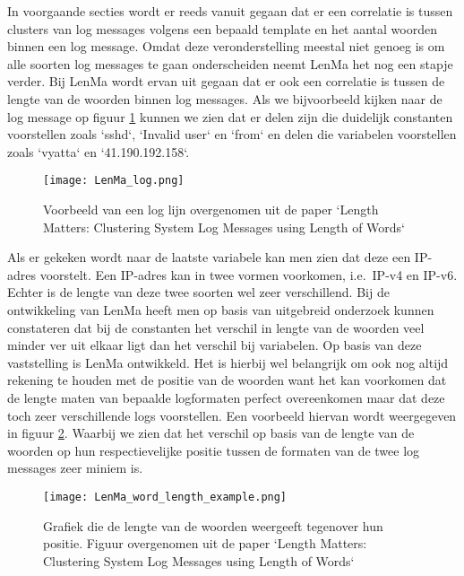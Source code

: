 In voorgaande secties wordt er reeds vanuit gegaan dat er een correlatie is tussen clusters van log messages volgens een bepaald template en het aantal woorden binnen een log message. Omdat deze veronderstelling meestal niet genoeg is om alle soorten log messages te gaan onderscheiden neemt LenMa het nog een stapje verder. Bij LenMa wordt ervan uit gegaan dat er ook een correlatie is tussen de lengte van de woorden binnen log messages. Als we bijvoorbeeld kijken naar de log message op figuur \ref{pic:LenMavoorbeeld} kunnen we zien dat er delen zijn die duidelijk constanten voorstellen zoals `sshd`, `Invalid user` en `from` en delen die variabelen voorstellen zoals `vyatta` en `41.190.192.158`.\\

\begin{figure}[!htp]
    \texttt{[image: LenMa\_log.png]}
    \caption{Voorbeeld van een log lijn overgenomen uit de paper `Length Matters: Clustering System Log Messages using Length of Words` \autocite{shima2016length}}
    \label{pic:LenMavoorbeeld}
\end{figure}

Als er gekeken wordt naar de laatste variabele kan men zien dat deze een IP-adres voorstelt. Een IP-adres kan in twee vormen voorkomen, i.e.\ IP-v4 en IP-v6. Echter is de lengte van deze twee soorten wel zeer verschillend. Bij de ontwikkeling van LenMa heeft men op basis van uitgebreid onderzoek kunnen constateren dat bij de constanten het verschil in lengte van de woorden veel minder ver uit elkaar ligt dan het verschil bij variabelen. Op basis van deze vaststelling is LenMa  ontwikkeld. Het is hierbij wel belangrijk om ook nog altijd rekening te houden met de positie van de woorden want het kan voorkomen dat de lengte maten van bepaalde logformaten perfect overeenkomen maar dat deze toch zeer verschillende logs voorstellen. Een voorbeeld hiervan wordt weergegeven in figuur \ref{pic:LenMagrafiek}. Waarbij we zien dat het verschil op basis van de lengte van de woorden op hun respectievelijke positie tussen de formaten van de twee log messages zeer miniem is.\\

\begin{figure}[!htp]
    \texttt{[image: LenMa\_word\_length\_example.png]}
    \caption{Grafiek die de lengte van de woorden weergeeft tegenover hun positie. Figuur overgenomen uit de paper `Length Matters: Clustering System Log Messages using Length of Words` \autocite{shima2016length}}
    \label{pic:LenMagrafiek}
\end{figure}


